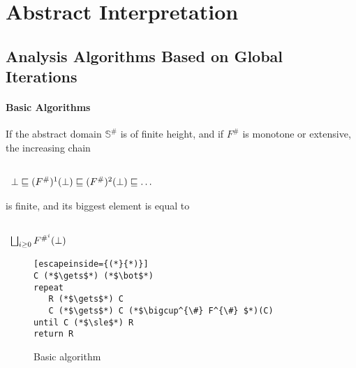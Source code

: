 
\chapter{Abstract Interpretation}
\label{chap:ai}

\section{Analysis Algorithms Based on Global Iterations}
\label{sec:global-iterations}

\subsubsection{Basic Algorithms}
\label{sec:basic-algorithm}

If the abstract domain $\mathbb{S}^{\#}$ is of finite height, and if
$F^{\#}$ is monotone or extensive, the increasing chain

\begin{math}
  \begin{array}{c}
    \\
    \bot \sqsubseteq (F^{\#})^1(\bot) \sqsubseteq (F^{\#})^2(\bot) \sqsubseteq \dots
    \\
  \end{array}
\end{math}

is finite, and its biggest element is equal to

\begin{math}
  \begin{array}{c}
    \\
    \bigsqcup_{i \geq 0} F^{{\#}^{i}} (\bot)
    \\
  \end{array}
\end{math}


\begin{figure}[h]
  \centering
  \begin{lstlisting}[escapeinside={(*}{*)}]
C (*$\gets$*) (*$\bot$*)
repeat
   R (*$\gets$*) C
   C (*$\gets$*) C (*$\bigcup^{\#} F^{\#} $*)(C)
until C (*$\sle$*) R
return R

  \end{lstlisting}
  \caption{Basic algorithm}
  \label{fig:basic}
\end{figure}
